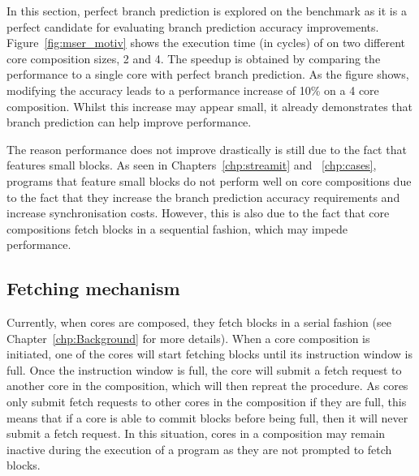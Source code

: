 In this section, perfect branch prediction is explored on the  benchmark as it is a perfect candidate for evaluating branch prediction accuracy improvements.
Figure~\ref{fig:mser_motiv} shows the execution time (in cycles) of  on two different core composition sizes, 2 and 4.
The speedup is obtained by comparing the performance to a single core with perfect branch prediction.
As the figure shows, modifying the accuracy leads to a performance increase of 10\% on a 4 core composition.
Whilst this increase may appear small, it already demonstrates that branch prediction can help improve performance.

The reason performance does not improve drastically is still due to the fact that  features small blocks.
As seen in Chapters~\ref{chp:streamit} and ~\ref{chp:cases}, programs that feature small blocks do not perform well on core compositions due to the fact that they increase the branch prediction accuracy requirements and increase synchronisation costs.
However, this is also due to the fact that core compositions fetch blocks in a sequential fashion, which may impede performance.

\subsection{Fetching mechanism}


Currently, when cores are composed, they fetch blocks in a serial fashion (see Chapter~\ref{chp:Background} for more details).
When a core composition is initiated, one of the cores will start fetching blocks until its instruction window is full.
Once the instruction window is full, the core will submit a fetch request to another core in the composition, which will then repreat the procedure.
As cores only submit fetch requests to other cores in the composition if they are full, this means that if a core is able to commit blocks before being full, then it will never submit a fetch request.
In this situation, cores in a composition may remain inactive during the execution of a program as they are not prompted to fetch blocks.

